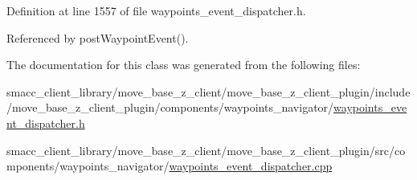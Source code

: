 Definition at line 1557 of file waypoints\+\_\+event\+\_\+dispatcher.\+h.



Referenced by post\+Waypoint\+Event().



The documentation for this class was generated from the following files\+:\begin{DoxyCompactItemize}
\item 
smacc\+\_\+client\+\_\+library/move\+\_\+base\+\_\+z\+\_\+client/move\+\_\+base\+\_\+z\+\_\+client\+\_\+plugin/include/move\+\_\+base\+\_\+z\+\_\+client\+\_\+plugin/components/waypoints\+\_\+navigator/\hyperlink{waypoints__event__dispatcher_8h}{waypoints\+\_\+event\+\_\+dispatcher.\+h}\item 
smacc\+\_\+client\+\_\+library/move\+\_\+base\+\_\+z\+\_\+client/move\+\_\+base\+\_\+z\+\_\+client\+\_\+plugin/src/components/waypoints\+\_\+navigator/\hyperlink{waypoints__event__dispatcher_8cpp}{waypoints\+\_\+event\+\_\+dispatcher.\+cpp}\end{DoxyCompactItemize}

